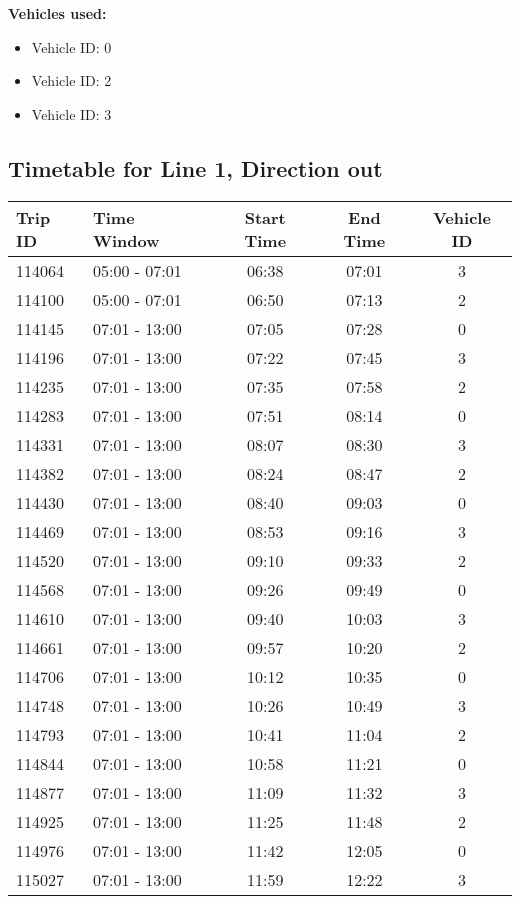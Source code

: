 \documentclass{article}
\begin{document}
\textbf{Vehicles used:}
\begin{itemize}
  \item Vehicle ID: 0
  \item Vehicle ID: 2
  \item Vehicle ID: 3
\end{itemize}

\subsection*{Timetable for Line 1, Direction out}
\begin{tabular}{llccc}
\toprule
Trip ID & Time Window & Start Time & End Time & Vehicle ID \\
\midrule
114064 & 05:00 - 07:01 & 06:38 & 07:01 & 3 \\
114100 & 05:00 - 07:01 & 06:50 & 07:13 & 2 \\
114145 & 07:01 - 13:00 & 07:05 & 07:28 & 0 \\
114196 & 07:01 - 13:00 & 07:22 & 07:45 & 3 \\
114235 & 07:01 - 13:00 & 07:35 & 07:58 & 2 \\
114283 & 07:01 - 13:00 & 07:51 & 08:14 & 0 \\
114331 & 07:01 - 13:00 & 08:07 & 08:30 & 3 \\
114382 & 07:01 - 13:00 & 08:24 & 08:47 & 2 \\
114430 & 07:01 - 13:00 & 08:40 & 09:03 & 0 \\
114469 & 07:01 - 13:00 & 08:53 & 09:16 & 3 \\
114520 & 07:01 - 13:00 & 09:10 & 09:33 & 2 \\
114568 & 07:01 - 13:00 & 09:26 & 09:49 & 0 \\
114610 & 07:01 - 13:00 & 09:40 & 10:03 & 3 \\
114661 & 07:01 - 13:00 & 09:57 & 10:20 & 2 \\
114706 & 07:01 - 13:00 & 10:12 & 10:35 & 0 \\
114748 & 07:01 - 13:00 & 10:26 & 10:49 & 3 \\
114793 & 07:01 - 13:00 & 10:41 & 11:04 & 2 \\
114844 & 07:01 - 13:00 & 10:58 & 11:21 & 0 \\
114877 & 07:01 - 13:00 & 11:09 & 11:32 & 3 \\
114925 & 07:01 - 13:00 & 11:25 & 11:48 & 2 \\
114976 & 07:01 - 13:00 & 11:42 & 12:05 & 0 \\
115027 & 07:01 - 13:00 & 11:59 & 12:22 & 3 \\

\end{tabular}
\end{document}

